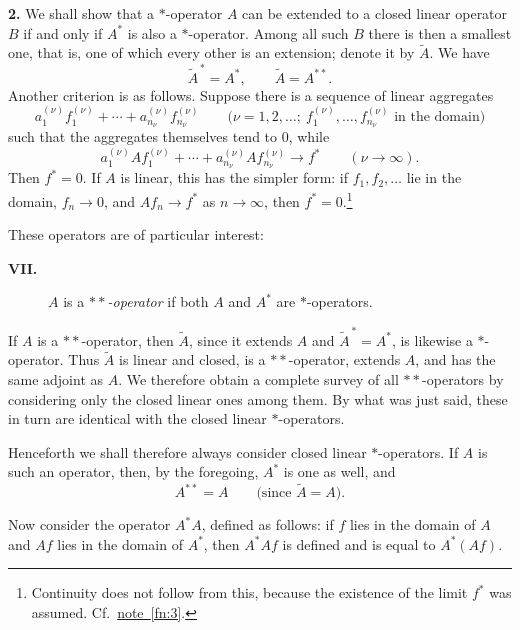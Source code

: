 \documentclass[fontsize=13pt,paper=b5,leqno,bookmarkpackage=false]{scrartcl}
\begin{document}
\label{intro:2}
\noindent\textbf{2.}
We shall show that a \(*\)-operator \(A\) can be extended to a closed
linear operator \(B\) if and only if \(A^*\) is also a
\(*\)-operator. Among all such \(B\) there is then a smallest one,
that is, one of which every other is an extension; denote it by
\(\widetilde A\). We have
\[
  \widetilde A^{\,*}=A^*,
  \qquad
  \widetilde A=A^{**}.
\]
Another criterion is as follows. Suppose there is a sequence of linear
aggregates
\[
  a_1^{(\nu)}f_1^{(\nu)}+\cdots+
  a_{n_\nu}^{(\nu)}f_{n_\nu}^{(\nu)}
  \qquad
  \bigl(\nu=1,2,\ldots;\ 
  f_1^{(\nu)},\ldots,f_{n_\nu}^{(\nu)}
  \text{ in the domain}\bigr)
\]
such that the aggregates themselves
tend to \(0\), while
\[
  a_1^{(\nu)}Af_1^{(\nu)}+\cdots+
  a_{n_\nu}^{(\nu)}Af_{n_\nu}^{(\nu)}
  \longrightarrow f^*
  \qquad(\nu\to\infty).
\]
Then \(f^*=0\). If \(A\) is linear, this has the simpler form: if
\(f_1,f_2,\ldots\) lie in the domain, \(f_n\to0\), and
\(Af_n\to f^*\) as \(n\to\infty\), then \(f^*=0\).\footnote{%
\label{fn:8}Continuity does not follow from this, because the existence
of the limit \(f^*\) was assumed. Cf.\ \hyperref[fn:3]{note~\ref*{fn:3}}.}

These operators are of particular interest:

\begin{description}
\item[\textbf{VII.}]
\(A\) is a \emph{\(**\)-operator} if both \(A\) and \(A^*\) are
\(*\)-operators.
\end{description}

If \(A\) is a \(**\)-operator, then \(\widetilde A\), since it extends
\(A\) and \(\widetilde A^{\,*}=A^*\), is likewise a \(*\)-operator.
Thus \(\widetilde A\) is linear and closed, is a \(**\)-operator, extends
\(A\), and has the same adjoint as \(A\). We therefore obtain a complete
survey of all \(**\)-operators by considering only the closed linear
ones among them. By what was just said, these in turn are identical with
the closed linear \(*\)-operators.

Henceforth we shall therefore always consider closed linear
\(*\)-operators. If \(A\) is such an operator, then, by the foregoing,
\(A^*\) is one as well, and
\[
  A^{**}=A
  \qquad\bigl(\text{since }\widetilde A=A\bigr).
\]

Now consider the operator \(A^*A\), defined as follows: if \(f\) lies in
the domain of \(A\) and \(Af\) lies in the domain of \(A^*\), then
\(A^*Af\) is defined and is equal to \(A^*(Af)\).
\end{document}
